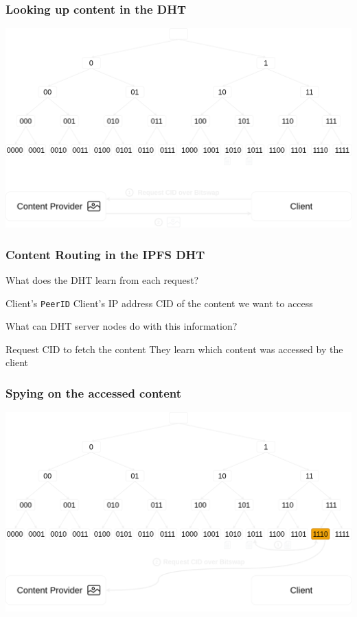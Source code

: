 \documentclass{pl-slide}
\begin{document}
\begin{frame}
\frametitle{Looking up content in the DHT}
\begin{minipage}[b]{\linewidth}
\begin{center}
	\includegraphics[width=.8\linewidth,keepaspectratio]{resources/dht/dht-bitswap-request.png}
\end{center}
\end{minipage}
\end{frame}


\begin{frame}
\frametitle{Content Routing in the IPFS DHT}
{\Large What does the DHT learn from each request?}
\begin{itemize}
	\itemc Client's \texttt{PeerID}
	\itemc Client's IP address
	\itemc CID of the content we want to access
\end{itemize}
\bigskip

{\Large What can DHT server nodes do with this information?}
\begin{itemize}
	\itemc Request CID to fetch the content
	\itemc They learn which content was accessed by the client
\end{itemize}
\end{frame}

\begin{frame}
\frametitle{Spying on the accessed content}
\begin{minipage}[b]{\linewidth}
\begin{center}
	\includegraphics[width=.8\linewidth,keepaspectratio]{resources/dht/dht-attacker1.png}
\end{center}
\end{minipage}
\end{frame}
\end{document}
